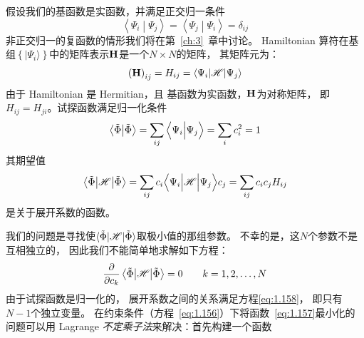 假设我们的基函数是实函数，并满足正交归一条件
\begin{equation}
 \left\langle\Psi_i\middle\vert\Psi_j\right\rangle = \left\langle\Psi_j\middle\vert\Psi_i\right\rangle = \delta_{ij}
 \label{eq:1.154}
\end{equation}
非正交归一的复函数的情形我们将在第~\ref{ch:3}~章中讨论。
Hamiltonian 算符在基组$\left\{\vert\Psi_i\rangle\right\}$中的矩阵表示$\mathbf{H}$是一个$N\times N$的矩阵，
其矩阵元为：
\begin{equation}
 \left(\mathbf{H}\right)_{ij} = H_{ij} = \left\langle \Psi_i\middle\vert \mathscr{H} \middle\vert \Psi_j\right\rangle
 \label{eq:1.155}
\end{equation}
由于 Hamiltonian 是 Hermitian，且
基函数为实函数，$\mathbf H$为对称矩阵，
即$H_{ij} = H_{ji}$。试探函数满足归一化条件
\begin{equation}
 \left\langle \tilde\Phi \middle\vert \tilde\Phi \right\rangle = \sum_{ij}\Big\langle\Psi_i\Big\vert\Psi_j\Big\rangle = \sum_i c_i^2 = 1
 \label{eq:1.156}
\end{equation}
其期望值
\begin{equation}
 \left\langle \tilde\Phi\middle\vert \mathscr{H} \middle\vert \tilde\Phi\right\rangle = \sum_{ij}c_i\Big\langle\Psi_i\Big\vert\mathscr{H}\Big\vert\Psi_j\Big\rangle c_j = \sum_{ij}c_ic_jH_{ij}
 \label{eq:1.157}
\end{equation}
是关于展开系数的函数。

我们的问题是寻找使$\langle\tilde\Phi\vert\mathscr{H}\vert\tilde\Phi\rangle$取极小值的那组参数。
不幸的是，这$N$个参数不是互相独立的，
因此我们不能简单地求解如下方程：
\begin{equation}
 \frac{\partial}{\partial c_k} \left\langle \tilde\Phi\middle\vert \mathscr{H} \middle\vert \tilde\Phi\right\rangle = 0 \qquad k = 1, 2, \dots, N
 \label{eq:1.158}
\end{equation}
由于试探函数是归一化的，
展开系数之间的关系满足方程\eqref{eq:1.158}，
即只有$N-1$个独立变量。
在约束条件（方程~\ref{eq:1.156}）下将函数~\ref{eq:1.157}最小化的问题可以用 Lagrange \emph{不定乘子法}来解决：首先构建一个函数

